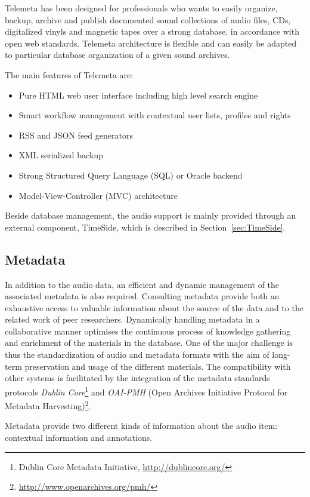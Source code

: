 \documentclass{paper}
\begin{document}
Telemeta has been designed for professionals who wants to easily organize, backup, archive and publish documented sound collections of audio files, CDs, digitalized vinyls and magnetic tapes over a strong database, in accordance with open web standards. 
Telemeta architecture is flexible and can easily be adapted to particular database organization of a given sound archives. 

The main features of Telemeta are:
\begin{itemize}
\item Pure HTML web user interface including high level search engine
\item Smart workflow management with contextual user lists, profiles and rights
\item RSS and JSON feed generators
\item XML serialized backup
\item Strong Structured Query Language (SQL) or Oracle backend
\item Model-View-Controller (MVC) architecture 
\end{itemize}
Beside database management, the audio support is mainly provided through an external component, TimeSide, which is described in Section~\ref{sec:TimeSide}.
\subsection{Metadata}\label{sec:metadata}
In addition to the audio data, an efficient and dynamic management of the associated metadata is also required. Consulting metadata provide both an exhaustive access to valuable information about the source of the data and to the related work of peer researchers. 
Dynamically handling metadata in a collaborative manner optimises the continuous process of knowledge gathering and enrichment of the materials in the database.  
One of the major challenge is thus the standardization of audio and metadata formats with the aim of long-term preservation and usage of the different materials.
The compatibility with other systems is facilitated by the integration of the metadata standards protocols \emph{Dublin Core}\footnote{{Dublin Core} Metadata Initiative, \url{http://dublincore.org/}} and \emph{OAI-PMH} (Open Archives Initiative Protocol for Metadata Harvesting)\footnote{\url{http://www.openarchives.org/pmh/}}.

Metadata provide two different kinds of information about the audio item: contextual information and annotations.
\end{document}
